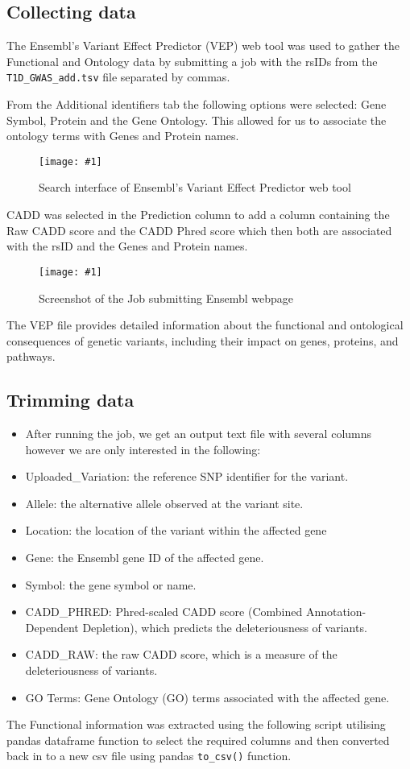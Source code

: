 \documentclass[12pt,a4paper]{article}
\newcommand{\subsubsect}[1]{
\hypertarget{#1}{
\subsection{#1}\label{#1}}
}
\newcommand{\pic}[2]{
\begin{figure}[h]
    \centering
    \captionsetup{justification=centering}
    \texttt{[image: \#1]}
    \caption{#2}
    \label{#1}
\end{figure}
}
\begin{document}
\subsubsect{Collecting data}
The Ensembl's Variant Effect Predictor (VEP) web tool was used to gather the Functional and Ontology data by submitting a job with the rsIDs from the \texttt{T1D\_GWAS\_add.tsv} file separated by commas.


From the Additional identifiers tab the following options were selected: Gene Symbol, Protein and the Gene Ontology. This allowed for us to associate the ontology terms with Genes and Protein names.
\pic{VEP_search}{Search interface of Ensembl's Variant Effect Predictor web tool}


CADD was selected in the Prediction column to add a column containing the Raw CADD score and the CADD Phred score which then both are associated with the rsID and the Genes and Protein names.

\pic{VEP_pred}{Screenshot of the Job submitting Ensembl webpage}


The VEP file provides detailed information about the functional and ontological consequences of genetic variants, including their impact on genes, proteins, and pathways.

\subsubsect{Trimming data}
\begin{itemize}
\item After running the job, we get an output text file with several columns however we are only interested in the following:
\item Uploaded\_Variation: the reference SNP identifier for the variant.
\item Allele: the alternative allele observed at the variant site.
\item Location: the location of the variant within the affected gene
\item Gene: the Ensembl gene ID of the affected gene.
\item Symbol: the gene symbol or name.
\item CADD\_PHRED: Phred-scaled CADD score (Combined Annotation-Dependent Depletion), which predicts the deleteriousness of variants.
\item CADD\_RAW: the raw CADD score, which is a measure of the deleteriousness of variants.
\item GO Terms: Gene Ontology (GO) terms associated with the affected gene.
\end{itemize}
The Functional information was extracted using the following script utilising pandas dataframe function to select the required columns and then converted back in to a new csv file using pandas \verb|to_csv()| function.
\end{document}
